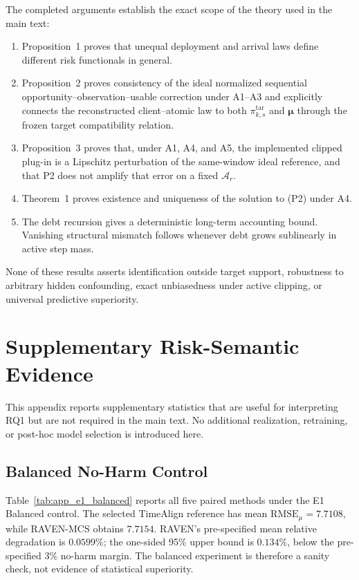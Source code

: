 The completed arguments establish the exact scope of the theory used in
the main text:

\begin{enumerate}
    \item Proposition~1 proves that unequal deployment and arrival laws define
    different risk functionals in general.
    \item Proposition~2 proves consistency of the ideal normalized sequential
    opportunity--observation--usable correction under A1--A3 and explicitly
    connects the reconstructed client--atomic law to both
    $\pi^{\mathrm{tar}}_{k,s}$ and $\boldsymbol\mu$ through the frozen target
    compatibility relation.
    \item Proposition~3 proves that, under A1, A4, and A5, the implemented
    clipped plug-in is a Lipschitz perturbation of the same-window ideal
    reference, and that P2 does not amplify that error on a fixed
    $\mathcal{A}_r$.
    \item Theorem~1 proves existence and uniqueness of the solution to (P2)
    under A4.
    \item The debt recursion gives a deterministic long-term accounting bound.
    Vanishing structural mismatch follows whenever debt grows sublinearly in
    active step mass.
\end{enumerate}

None of these results asserts identification outside target support, robustness
to arbitrary hidden confounding, exact unbiasedness under active clipping, or
universal predictive superiority.




\section{Supplementary Risk-Semantic Evidence}
\label{app:risk_semantic_evidence}

This appendix reports supplementary statistics that are useful for interpreting
RQ1 but are not required in the main text.  No additional realization,
retraining, or post-hoc model selection is introduced here.

\subsection{Balanced No-Harm Control}
\label{app:e1_balanced}

Table~\ref{tab:app_e1_balanced} reports all five paired methods under the E1
Balanced control.  The selected TimeAlign reference has mean
$\mathrm{RMSE}_\mu=7.7108$, while RAVEN-MCS obtains $7.7154$.  RAVEN's
pre-specified mean relative degradation is $0.0599\%$; the one-sided 95\%
upper bound is $0.134\%$, below the pre-specified $3\%$ no-harm margin.  The
balanced experiment is therefore a sanity check, not evidence of statistical
superiority.

